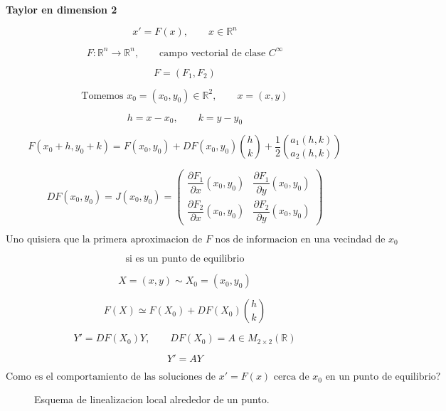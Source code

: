 ﻿\documentclass[11pt,letterpaper]{article}
\begin{document}
\newpage

\textbf{Taylor en dimension 2}

\[
x' = F(x), \qquad x\in\mathbb{R}^n
\]

\[
F:\mathbb{R}^n\to\mathbb{R}^n, \qquad \text{campo vectorial de clase } C^\infty
\]

\[
F=(F_1,F_2)
\]

\[
\text{Tomemos }x_0=(x_0,y_0)\in\mathbb{R}^2,\qquad x=(x,y)
\]

\[
h=x-x_0,\qquad k=y-y_0
\]

\[
F(x_0+h,y_0+k)=F(x_0,y_0)+DF(x_0,y_0)\binom{h}{k}+\frac12\binom{a_1(h,k)}{a_2(h,k)}
\]

\[
DF(x_0,y_0)=J(x_0,y_0)=
\begin{pmatrix}
\dfrac{\partial F_1}{\partial x}(x_0,y_0) & \dfrac{\partial F_1}{\partial y}(x_0,y_0)\\[1ex]
\dfrac{\partial F_2}{\partial x}(x_0,y_0) & \dfrac{\partial F_2}{\partial y}(x_0,y_0)
\end{pmatrix}
\]

\[
\text{Uno quisiera que la primera aproximacion de }F\text{ nos de informacion en una vecindad de }x_0
\]

\[
\text{si es un punto de equilibrio}
\]

\[
X=(x,y)\sim X_0=(x_0,y_0)
\]

\[
F(X)\simeq F(X_0)+DF(X_0)\binom{h}{k}
\]

\[
Y'=DF(X_0)Y, \qquad DF(X_0)=A\in M_{2\times 2}(\mathbb{R})
\]

\[
Y'=AY
\]

\[
\text{Como es el comportamiento de las soluciones de }x'=F(x)\text{ cerca de }x_0\text{ en un punto de equilibrio?}
\]

\begin{figure}[H]
\centering
{}
\caption{Esquema de linealizacion local alrededor de un punto.}
\end{figure}

\newpage
\end{document}
